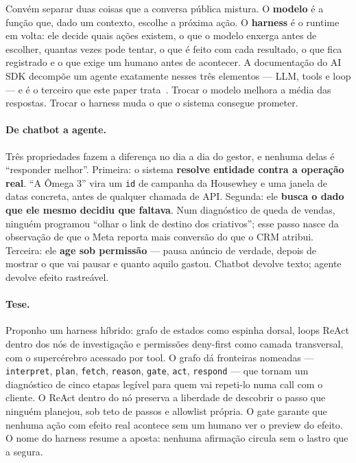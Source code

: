 \documentclass[10pt,twocolumn]{article}
\newcommand{\code}[1]{\texttt{\footnotesize #1}}
\begin{document}
Convém separar duas coisas que a conversa pública mistura. O \textbf{modelo} é a função
que, dado um contexto, escolhe a próxima ação. O \textbf{harness} é o runtime em volta: ele
decide quais ações existem, o que o modelo enxerga antes de escolher, quantas vezes pode
tentar, o que é feito com cada resultado, o que fica registrado e o que exige um humano
antes de acontecer. A documentação do AI SDK decompõe um agente exatamente nesses três
elementos --- LLM, tools e loop --- e é o terceiro que este paper trata~\cite{vercel2026aisdk}.
Trocar o modelo melhora a média das respostas. Trocar o harness muda o que o sistema
consegue prometer.

\paragraph{De chatbot a agente.} Três propriedades fazem a diferença no dia a dia do gestor,
e nenhuma delas é ``responder melhor''. Primeira: o sistema \textbf{resolve entidade contra
a operação real}. ``A Ômega 3'' vira um \code{id} de campanha da Housewhey e uma janela de
datas concreta, antes de qualquer chamada de API. Segunda: ele \textbf{busca o dado que ele
mesmo decidiu que faltava}. Num diagnóstico de queda de vendas, ninguém programou ``olhar o
link de destino dos criativos''; esse passo nasce da observação de que o Meta reporta mais
conversão do que o CRM atribui. Terceira: ele \textbf{age sob permissão} --- pausa anúncio
de verdade, depois de mostrar o que vai pausar e quanto aquilo gastou. Chatbot devolve
texto; agente devolve efeito rastreável.

\paragraph{Tese.} Proponho um harness híbrido: grafo de estados como espinha dorsal, loops
ReAct dentro dos nós de investigação e permissões deny-first como camada transversal, com o
supercérebro acessado por tool. O grafo dá fronteiras nomeadas --- \code{interpret},
\code{plan}, \code{fetch}, \code{reason}, \code{gate}, \code{act}, \code{respond} --- que
tornam um diagnóstico de cinco etapas legível para quem vai repeti-lo numa call com o
cliente. O ReAct dentro do nó preserva a liberdade de descobrir o passo que ninguém
planejou, sob teto de passos e allowlist própria. O gate garante que nenhuma ação com
efeito real acontece sem um humano ver o preview do efeito. O nome do harness resume a
aposta: nenhuma afirmação circula sem o lastro que a segura.
\end{document}
